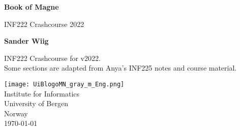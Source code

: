 
\begin{titlepage}
    \begin{center}
        \vspace*{1cm}

        \huge
        \textbf{Book of Magne}

        \vspace{0.5cm}
        \LARGE
        INF222 Crashcourse 2022
            
        \vspace{1.5cm}

        \textbf{Sander Wiig}

        \vfill
        
        \Large
        INF222 Crashcourse for v2022.\\
        Some sections are adapted from Anya's INF225 notes and course material.
            
        \vspace{0.5cm}
    
        \texttt{[image: UiBlogoMN\_gray\_m\_Eng.png]}\\
        \Large
        Institute for Informatics\\
        University of Bergen\\
        Norway\\
        \today
            
    \end{center}
\end{titlepage}
\newpage
\tableofcontents
\newpage